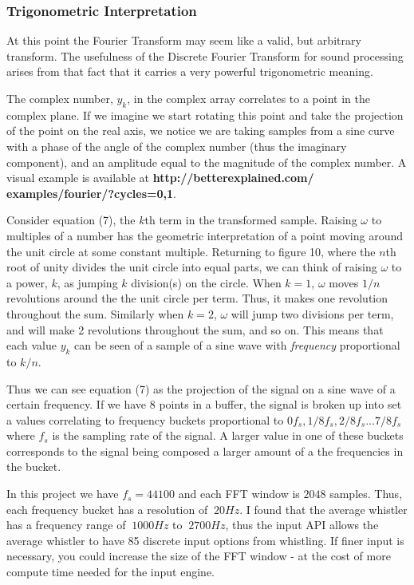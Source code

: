 \documentclass[DIV=calc, paper=a4, fontsize=11pt, twocolumn]{scrartcl}   %
\begin{document}
\subsubsection{Trigonometric Interpretation}

At this point the Fourier Transform may seem like a valid, but arbitrary transform. The usefulness of the Discrete Fourier Transform for sound processing arises from that fact that it carries a very powerful trigonometric meaning.

\par The complex number, $y_k$, in the complex array correlates to a point in the complex plane. If we imagine we start rotating this point and take the projection of the point on the real axis, we notice we are taking samples from a sine curve with a phase of the angle of the complex number (thus the imaginary component), and an amplitude equal to the magnitude of the complex number. A visual example is available at \textbf{http://betterexplained.com/ examples/fourier/?cycles=0,1}.

Consider equation (7), the $k$th term in the transformed sample. Raising $\omega$ to multiples of a number has the geometric interpretation of a point moving around the unit circle at some constant multiple. Returning to figure 10, where the $n$th root of unity divides the unit circle into equal parts, we can think of raising $\omega$ to a power, $k$, as jumping $k$ division(s) on the circle. When $k = 1$, $\omega$ moves $1/n$ revolutions around the the unit circle per term. Thus, it makes one revolution throughout the sum. Similarly when $k=2$, $\omega$ will jump two divisions per term, and will make 2 revolutions throughout the sum, and so on. This means that each value $y_k$  can be seen of a sample of a sine wave with \textit{frequency} proportional to $k/n$.

Thus we can see equation (7) as the projection of the signal on a sine wave of a certain frequency. If we have 8 points in a buffer, the signal is broken up into set a values correlating to frequency buckets proportional to $0f_s,1/8f_s,2/8f_s...7/8f_s$ where $f_s$ is the sampling rate of the signal. A larger value in one of these buckets corresponds to the signal being composed a larger amount of a the frequencies in the bucket.

\par
In this project we have $f_s=44100$ and each FFT window is $2048$ samples. Thus, each frequency bucket has a resolution of $~20Hz$. I found that the average whistler has a frequency range of $~1000Hz$ to $~2700Hz$, thus the input API allows the average whistler to have 85 discrete input options from whistling. If finer input is necessary, you could increase the size of the FFT window - at the cost of more compute time needed for the input engine.
\end{document}
